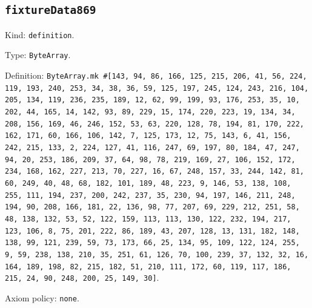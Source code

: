 \documentclass[11pt]{article}
\begin{document}
\subsection*{\texttt{fixtureData869}}
\noindent Kind: \texttt{definition}.\par
\noindent Type: \texttt{ByteArray}.\par
\noindent Definition: \texttt{ByteArray.mk \#[143, 94, 86, 166, 125, 215, 206, 41, 56, 224, 119, 193, 240, 253, 34, 38, 36, 59, 125, 197, 245, 124, 243, 216, 104, 205, 134, 119, 236, 235, 189, 12, 62, 99, 199, 93, 176, 253, 35, 10, 202, 44, 165, 14, 142, 93, 89, 229, 15, 174, 220, 223, 19, 134, 34, 208, 156, 169, 46, 246, 152, 53, 63, 220, 128, 78, 194, 81, 170, 222, 162, 171, 60, 166, 106, 142, 7, 125, 173, 12, 75, 143, 6, 41, 156, 242, 215, 133, 2, 224, 127, 41, 116, 247, 69, 197, 80, 184, 47, 247, 94, 20, 253, 186, 209, 37, 64, 98, 78, 219, 169, 27, 106, 152, 172, 234, 168, 162, 227, 213, 70, 227, 16, 67, 248, 157, 33, 244, 142, 81, 60, 249, 40, 48, 68, 182, 101, 189, 48, 223, 9, 146, 53, 138, 108, 255, 111, 194, 237, 200, 242, 237, 35, 230, 94, 197, 146, 211, 248, 194, 90, 208, 166, 181, 22, 136, 98, 77, 207, 69, 229, 212, 251, 58, 48, 138, 132, 53, 52, 122, 159, 113, 113, 130, 122, 232, 194, 217, 123, 106, 8, 75, 201, 222, 86, 189, 43, 207, 128, 13, 131, 182, 148, 138, 99, 121, 239, 59, 73, 173, 66, 25, 134, 95, 109, 122, 124, 255, 9, 59, 238, 138, 210, 35, 251, 61, 126, 70, 100, 239, 37, 132, 32, 16, 164, 189, 198, 82, 215, 182, 51, 210, 111, 172, 60, 119, 117, 186, 215, 24, 90, 248, 200, 25, 149, 30]}.\par
\noindent Axiom policy: \texttt{none}.\par
\end{document}

